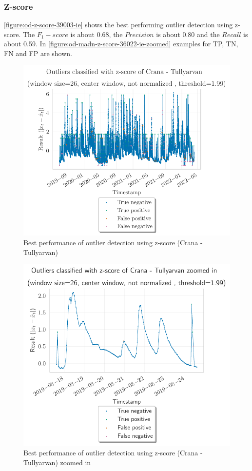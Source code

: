 \subsubsection{Z-score}
\autoref{figure:od-z-score-39003-ie} shows the best performing outlier detection using z-score. The $F_1-score$ is about 0.68, the $Precision$ is about 0.80 and the $Recall$ is about 0.59. In \autoref{figure:od-madn-z-score-36022-ie-zoomed} examples for \ac{TP}, \ac{TN}, \ac{FN} and \ac{FP} are shown.
\begin{figure}[htp]
    \centering 
    \includegraphics{plots/pdfs/39003-ie/od_z-score_39003-ie_all.pdf}
    \caption{Best performance of outlier detection using z-score (Crana - Tullyarvan)}
    \label{figure:od-z-score-39003-ie}
\end{figure}
\begin{figure}[htp]
    \centering 
    \includegraphics{plots/pdfs/39003-ie/od_z-score_39003-ie_zoomed.pdf}
    \caption{Best performance of outlier detection using z-score (Crana - Tullyarvan) zoomed in}
    \label{figure:od-z-score-39003-ie-zoomed}
\end{figure}
